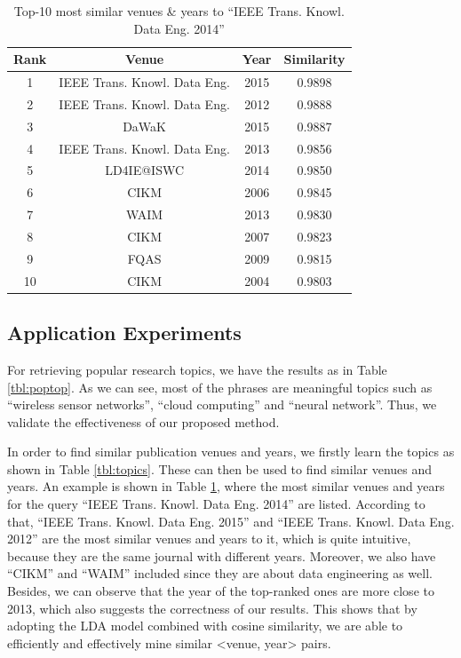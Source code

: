 \documentclass{sig-alternate-05-2015}
\begin{document}
\begin{table}
\centering
\caption{Top-10 most similar venues \& years to ``IEEE Trans. Knowl. Data Eng. 2014''} \label{tbl:simvy}
\begin{tabular}{cccc} \hline
Rank & Venue & Year & Similarity\\ 
\hline
1 & IEEE Trans. Knowl. Data Eng. & 2015 & 0.9898 \\ 
2 & IEEE Trans. Knowl. Data Eng. & 2012 & 0.9888 \\
3 & DaWaK & 2015 & 0.9887 \\ 
4 & IEEE Trans. Knowl. Data Eng. & 2013 & 0.9856 \\
5 & LD4IE@ISWC & 2014 & 0.9850 \\
6 & CIKM & 2006 & 0.9845 \\
7 & WAIM & 2013 & 0.9830 \\
8 & CIKM & 2007 & 0.9823 \\
9 & FQAS & 2009 & 0.9815 \\
10 & CIKM & 2004 & 0.9803 \\
\hline
\end{tabular}
\end{table}

\subsection{Application Experiments}
For retrieving popular research topics, we have the results as in Table \ref{tbl:poptop}. As we can see, most of the phrases are meaningful topics such as ``wireless sensor networks'', ``cloud computing'' and ``neural network''. Thus, we validate the effectiveness of our proposed method.

In order to find similar publication venues and years, we firstly learn the topics as shown in Table \ref{tbl:topics}. These can then be used to find similar venues and years. An example is shown in Table \ref{tbl:simvy}, where the most similar venues and years for the query ``IEEE Trans. Knowl. Data Eng. 2014'' are listed. According to that, ``IEEE Trans. Knowl. Data Eng. 2015'' and ``IEEE Trans. Knowl. Data Eng. 2012'' are the most similar venues and years to it, which is quite intuitive, because they are the same journal with different years. Moreover, we also have ``CIKM'' and ``WAIM'' included since they are about data engineering as well. Besides, we can observe that the year of the top-ranked ones are more close to 2013, which also suggests the correctness of our results. This shows that by adopting the LDA model combined with cosine similarity, we are able to efficiently and effectively mine similar <venue, year> pairs.
\end{document}
